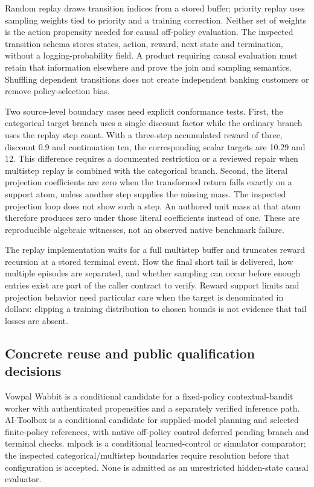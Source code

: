 Random replay draws transition indices from a stored buffer; priority replay uses sampling weights tied to priority and a training correction. Neither set of weights is the action propensity needed for causal off-policy evaluation. The inspected transition schema stores states, action, reward, next state and termination, without a logging-probability field. A product requiring causal evaluation must retain that information elsewhere and prove the join and sampling semantics. Shuffling dependent transitions does not create independent banking customers or remove policy-selection bias.~\citep{exec24_policycxx_mlpack,exec24_policycxx_comparison}

Two source-level boundary cases need explicit conformance tests. First, the categorical target branch uses a single discount factor while the ordinary branch uses the replay step count. With a three-step accumulated reward of three, discount 0.9 and continuation ten, the corresponding scalar targets are 10.29 and 12. This difference requires a documented restriction or a reviewed repair when multistep replay is combined with the categorical branch. Second, the literal projection coefficients are zero when the transformed return falls exactly on a support atom, unless another step supplies the missing mass. The inspected projection loop does not show such a step. An authored unit mass at that atom therefore produces zero under those literal coefficients instead of one. These are reproducible algebraic witnesses, not an observed native benchmark failure.~\citep{exec24_policycxx_mlpack,exec24_policycxx_comparison}

The replay implementation waits for a full multistep buffer and truncates reward recursion at a stored terminal event. How the final short tail is delivered, how multiple episodes are separated, and whether sampling can occur before enough entries exist are part of the caller contract to verify. Reward support limits and projection behavior need particular care when the target is denominated in dollars: clipping a training distribution to chosen bounds is not evidence that tail losses are absent.~\citep{exec24_policycxx_mlpack,exec24_policycxx_comparison}

\subsection{Concrete reuse and public qualification decisions}
Vowpal Wabbit is a conditional candidate for a fixed-policy contextual-bandit worker with authenticated propensities and a separately verified inference path. AI-Toolbox is a conditional candidate for supplied-model planning and selected finite-policy references, with native off-policy control deferred pending branch and terminal checks. mlpack is a conditional learned-control or simulator comparator; the inspected categorical/multistep boundaries require resolution before that configuration is accepted. None is admitted as an unrestricted hidden-state causal evaluator.~\citep{exec24_policycxx_comparison}

